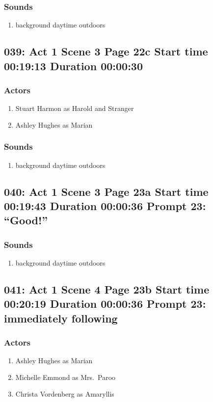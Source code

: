 \subsubsection{Sounds}
\begin{enumerate}
\item background daytime outdoors
\end{enumerate}
\subsection{039: Act 1 Scene 3 Page 22c Start time 00:19:13 Duration 00:00:30}

\subsubsection{Actors}
\begin{enumerate}
\item Stuart Harmon as Harold and Stranger
\item Ashley Hughes as Marian
\end{enumerate}

\subsubsection{Sounds}
\begin{enumerate}
\item background daytime outdoors
\end{enumerate}
\subsection{040: Act 1 Scene 3 Page 23a Start time 00:19:43 Duration 00:00:36 Prompt 23: ``Good!''}
\subsubsection{Sounds}
\begin{enumerate}
\item background daytime outdoors
\end{enumerate}
\subsection{041: Act 1 Scene 4 Page 23b Start time 00:20:19 Duration 00:00:36 Prompt 23: immediately following}

\subsubsection{Actors}
\begin{enumerate}
\item Ashley Hughes as Marian
\item Michelle Emmond as Mrs.~Paroo
\item Christa Vordenberg as Amaryllis
\end{enumerate}


